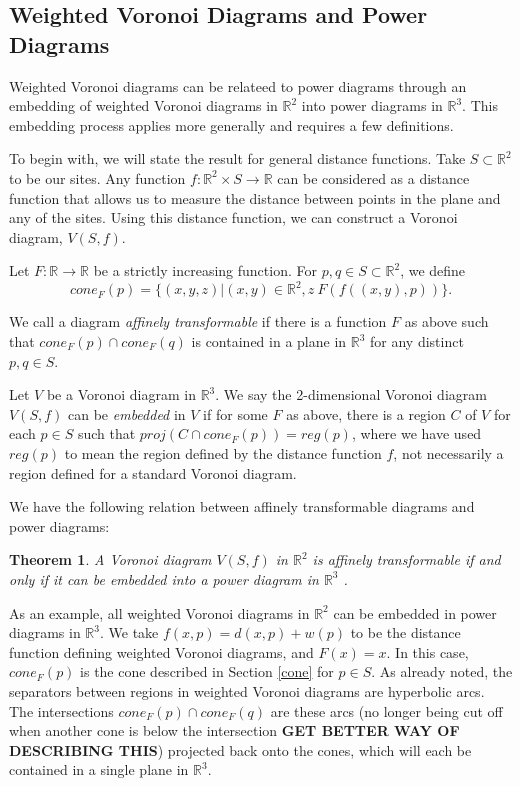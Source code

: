 \documentclass[a4paper, 11pt]{article}
\newtheorem{theorem}{Theorem}[section]
\newcommand{\R}{\mathbb{R}}
\begin{document}
\subsection{Weighted Voronoi Diagrams and Power Diagrams}

Weighted Voronoi diagrams can be relateed to power diagrams through an embedding of weighted Voronoi diagrams in $\R^2$ into power diagrams in $\R^3$.
This embedding process applies more generally and requires a few definitions.

To begin with, we will state the result for general distance functions. Take $S \subset \R^2$ to be our sites. Any function $f: \R^2 \times S \to \R$
can be considered as a distance function that allows us to measure the distance between points in the plane and any of the sites. Using this distance
function, we can construct a Voronoi diagram, $V(S,f)$.

Let $F: \R \to \R$ be a strictly increasing function. For $p,q \in S \subset \R^2$, we define
\[ cone_F(p) = \{ (x,y,z) | (x,y) \in \R^2, z \ F( f( (x,y), p) ) \}. \]

We call a diagram \textit{affinely transformable} if there is a function $F$ as above such that $cone_F(p) \cap cone_F(q)$ is contained in a plane in $\R^3$ for any distinct
$p,q \in S$.

Let $V$ be a Voronoi diagram in $\R^3$. We say the 2-dimensional Voronoi diagram $V(S,f)$ can be \textit{embedded} in $V$ if for some $F$ as above,
there is a region $C$ of $V$ for each $p \in S$ such that $proj( C \cap cone_F(p)) = reg(p)$, where we have used $reg(p)$ to mean the region defined
by the distance function $f$, not necessarily a region defined for a standard Voronoi diagram.

We have the following relation between affinely transformable diagrams and power diagrams:

\begin{theorem}
  \label{thm:affine}
  A Voronoi diagram $V(S,f)$ in $\R^2$ is affinely transformable if and only if it can be embedded into a power diagram in $\R^3$
  \cite{aurenhammer_additive}.
\end{theorem}

As an example, all weighted Voronoi diagrams in $\R^2$ can be embedded in power diagrams in $\R^3$. We take $f(x,p) = d(x,p) + w(p)$ to be the
distance function defining weighted Voronoi diagrams, and $F(x) = x$. In this case, $cone_F(p)$ is the cone described in Section \ref{cone} for $p \in
S$. As already noted, the separators between regions in weighted Voronoi diagrams are hyperbolic arcs. The intersections $cone_F(p) \cap cone_F(q)$
are these arcs (no longer being cut off when another cone is below the intersection \textbf{GET BETTER WAY OF DESCRIBING THIS}) projected back onto
the cones, which will each be contained in a single plane in $\R^3$.
\end{document}

